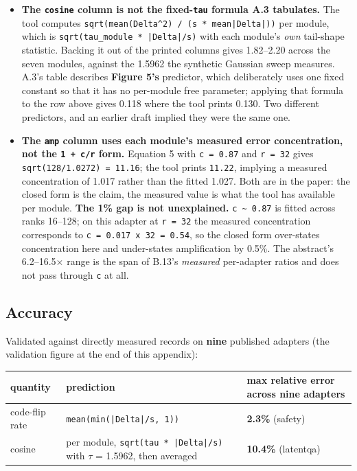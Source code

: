 \begin{itemize}
\item \textbf{The \texttt{cosine} column is not the fixed-\texttt{tau} formula A.3 tabulates.} The tool computes \texttt{sqrt(mean(Delta\textasciicircum{}2) / (s * mean|Delta|))} per module, which is \texttt{sqrt(tau\_\allowbreak{}module * |Delta|/\allowbreak{}s)} with each module's \emph{own} tail-shape statistic. Backing it out of the printed columns gives 1.82--2.20 across the seven modules, against the 1.5962 the synthetic Gaussian sweep measures. A.3's table describes \textbf{Figure 5's} predictor, which deliberately uses one fixed constant so that it has no per-module free parameter; applying that formula to the row above gives 0.118 where the tool prints 0.130. Two different predictors, and an earlier draft implied they were the same one.
\item \textbf{The \texttt{amp} column uses each module's measured error concentration, not the \texttt{1 + c/\allowbreak{}r} form.} Equation 5 with \texttt{c = 0.\allowbreak{}87} and \texttt{r = 32} gives \texttt{sqrt(128/\allowbreak{}1.\allowbreak{}0272) = 11.\allowbreak{}16}; the tool prints \texttt{11.\allowbreak{}22}, implying a measured concentration of 1.017 rather than the fitted 1.027. Both are in the paper: the closed form is the claim, the measured value is what the tool has available per module. \textbf{The 1\% gap is not unexplained.} \texttt{c \textasciitilde{} 0.\allowbreak{}87} is fitted across ranks 16--128; on this adapter at \texttt{r = 32} the measured concentration corresponds to \texttt{c = 0.\allowbreak{}017 x 32 = 0.\allowbreak{}54}, so the closed form over-states concentration here and under-states amplification by 0.5\%. The abstract's 6.2--16.5$\times$ range is the span of B.13's \emph{measured} per-adapter ratios and does not pass through \texttt{c} at all.
\end{itemize}

\subsection{Accuracy}

Validated against directly measured records on \textbf{nine} published adapters (the validation figure at the end of this appendix):

\begin{table}[t]
\centering\footnotesize
\begin{tabularx}{\textwidth}{l>{\hsize=1.196\hsize\raggedright\arraybackslash}X>{\hsize=0.804\hsize\raggedright\arraybackslash}X}
\toprule
quantity & prediction & max relative error across nine adapters \\
\midrule
code-flip rate & \texttt{mean(min(|Delta|/\allowbreak{}s, 1))} & \textbf{2.3\%} (safety) \\
cosine & per module, \texttt{sqrt(tau * |Delta|/\allowbreak{}s)} with $\tau$ = 1.5962, then averaged & \textbf{10.4\%} (latentqa) \\
\bottomrule
\end{tabularx}
\end{table}

